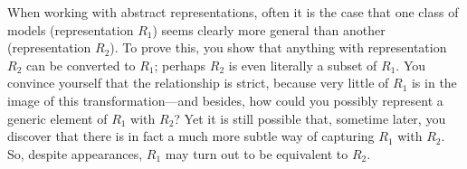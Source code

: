 
When working with abstract representations, often it is the case that one class of models (representation $R_1$) seems clearly more general than another (representation $R_2$).
To prove this, you show that anything with representation $R_2$ can be converted to $R_1$; perhaps $R_2$ is even literally a subset of $R_1$. 
You convince yourself that the relationship is strict, because very little of $R_1$ is in the image of this transformation---and besides, how could you possibly represent a generic element of $R_1$ with $R_2$? 
Yet it is still possible that, sometime later,
you discover that there is in fact a much more subtle way of capturing $R_1$ with $R_2$. 
So, despite appearances, $R_1$ may turn out to be equivalent to $R_2$. 

